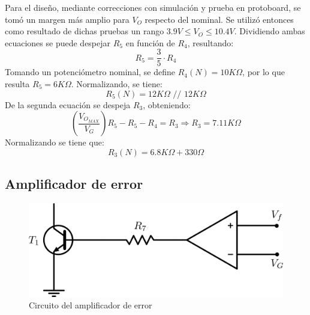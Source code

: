 Para el dise\~no, mediante correcciones con simulaci\'on y prueba en protoboard, se tom\'o un margen m\'as amplio para $V_O$ respecto del nominal. Se utiliz\'o entonces como resultado de dichas pruebas un rango $3.9V \leq V_O \leq 10.4V$. Dividiendo ambas ecuaciones se puede despejar $R_5$ en funci\'on de $R_4$, resultando:
\[
R_5 = \frac{3}{5} \cdot R_4
\]
Tomando un potenci\'ometro nominal, se define $R_4(N) = 10K\Omega$, por lo que resulta $R_5 = 6K\Omega$. Normalizando, se tiene:
\[
R_5(N) = 12K\Omega \textrm{ // } 12K\Omega
\]
De la segunda ecuaci\'on se despeja $R_3$, obteniendo:
\[
\left(\frac{V_{O_{MAX}}}{V_G}\right)R_5 - R_5 - R_4 = R_3 \Longrightarrow R_3 = 7.11K\Omega
\]
Normalizando se tiene que: 
\[
R_3(N) = 6.8K\Omega + 330\Omega
\]

\subsection{Amplificador de error}

\begin{figure}[!ht]
\begin{centering}
\includegraphics[scale=0.5]{Imagenes/CircuitoError.png}
\par\end{centering}
\caption{Circuito del amplificador de error}

\end{figure}


